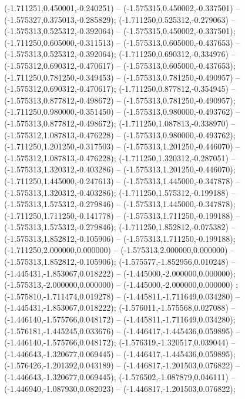  (-1.711251,0.450001,-0.240251) -- (-1.575315,0.450002,-0.337501) -- (-1.575327,0.375013,-0.285829);
 (-1.711250,0.525312,-0.279063) -- (-1.575313,0.525312,-0.392064) -- (-1.575315,0.450002,-0.337501);
 (-1.711250,0.605000,-0.311513) -- (-1.575313,0.605000,-0.437653) -- (-1.575313,0.525312,-0.392064);
 (-1.711250,0.690312,-0.334976) -- (-1.575312,0.690312,-0.470617) -- (-1.575313,0.605000,-0.437653);
 (-1.711250,0.781250,-0.349453) -- (-1.575313,0.781250,-0.490957) -- (-1.575312,0.690312,-0.470617);
 (-1.711250,0.877812,-0.354945) -- (-1.575313,0.877812,-0.498672) -- (-1.575313,0.781250,-0.490957);
 (-1.711250,0.980000,-0.351450) -- (-1.575313,0.980000,-0.493762) -- (-1.575313,0.877812,-0.498672);
 (-1.711250,1.087813,-0.338970) -- (-1.575312,1.087813,-0.476228) -- (-1.575313,0.980000,-0.493762);
 (-1.711250,1.201250,-0.317503) -- (-1.575313,1.201250,-0.446070) -- (-1.575312,1.087813,-0.476228);
 (-1.711250,1.320312,-0.287051) -- (-1.575313,1.320312,-0.403286) -- (-1.575313,1.201250,-0.446070);
 (-1.711250,1.445000,-0.247613) -- (-1.575313,1.445000,-0.347878) -- (-1.575313,1.320312,-0.403286);
 (-1.711250,1.575312,-0.199188) -- (-1.575313,1.575312,-0.279846) -- (-1.575313,1.445000,-0.347878);
 (-1.711250,1.711250,-0.141778) -- (-1.575313,1.711250,-0.199188) -- (-1.575313,1.575312,-0.279846);
 (-1.711250,1.852812,-0.075382) -- (-1.575313,1.852812,-0.105906) -- (-1.575313,1.711250,-0.199188);
 (-1.711250,2.000000,0.000000) -- (-1.575313,2.000000,0.000000) -- (-1.575313,1.852812,-0.105906);
 (-1.575577,-1.852956,0.010248) -- (-1.445431,-1.853067,0.018222) -- (-1.445000,-2.000000,0.000000);
 (-1.575313,-2.000000,0.000000) -- (-1.445000,-2.000000,0.000000) ;
 (-1.575810,-1.711474,0.019278) -- (-1.445811,-1.711649,0.034280) -- (-1.445431,-1.853067,0.018222);
 (-1.576011,-1.575568,0.027088) -- (-1.446140,-1.575766,0.048172) -- (-1.445811,-1.711649,0.034280);
 (-1.576181,-1.445245,0.033676) -- (-1.446417,-1.445436,0.059895) -- (-1.446140,-1.575766,0.048172);
 (-1.576319,-1.320517,0.039044) -- (-1.446643,-1.320677,0.069445) -- (-1.446417,-1.445436,0.059895);
 (-1.576426,-1.201392,0.043189) -- (-1.446817,-1.201503,0.076822) -- (-1.446643,-1.320677,0.069445);
 (-1.576502,-1.087879,0.046111) -- (-1.446940,-1.087930,0.082023) -- (-1.446817,-1.201503,0.076822);
